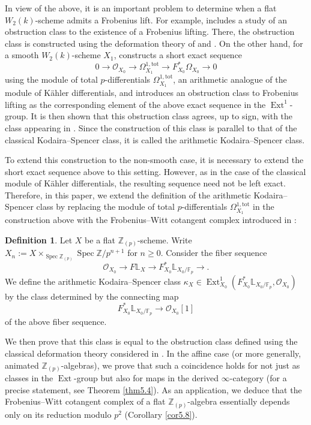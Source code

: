 \documentclass[11pt, a4paper]{amsart}
\theoremstyle{plain}
\theoremstyle{definition}
\newtheorem{definition}[theorem]{Definition}
\begin{document}
In view of the above, it is an important problem to determine when a flat $W_2(k)$-scheme admits a Frobenius lift. For example, \cite{Zda18} includes a study of an obstruction class to the existence of a Frobenius lifting. There, the obstruction class is constructed using the deformation theory of \cite{Ill71} and \cite{Ill72}. On the other hand, for a smooth $W_2(k)$-scheme $X_1$, \cite{DKRZB17} constructs a short exact sequence \[ 0\to \mathcal O_{X_0}\to \Omega_{X_1}^{1,\mathrm{tot}}\to F^*_{X_0}\Omega_{X_0}\to 0\] using the module of total $p$-differentials $\Omega_{X_1}^{1,\mathrm{tot}}$, an arithmetic analogue of the module of K\"ahler differentials, and introduces an obstruction class to Frobenius lifting as the corresponding element of the above exact sequence in the $\operatorname{Ext}^1$-group. It is then shown that this obstruction class agrees, up to sign, with the class appearing in \cite{DI87}. Since the construction of this class is parallel to that of the classical Kodaira--Spencer class, it is called the arithmetic Kodaira--Spencer class. 

To extend this construction to the non-smooth case, it is necessary to extend the short exact sequence above to this setting. However, as in the case of the classical module of K\"ahler differentials, the resulting sequence need not be left exact. Therefore, in this paper, we extend the definition of the arithmetic Kodaira--Spencer class by replacing the module of total $p$-differentials $\Omega_{X_1}^{1,\mathrm{tot}}$ in the construction above with the Frobenius--Witt cotangent complex introduced in \cite{Shi26}: 
\begin{definition}
    Let $X$ be a flat $\mathbb Z_{(p)}$-scheme. Write $X_n:=X\times_{\operatorname{Spec}\mathbb Z_{(p)}}\operatorname{Spec}\mathbb Z/p^{n+1}$ for $n\ge0$. Consider the fiber sequence
    \[\mathcal O_{X_0}\to F\mathbb L_{X}\to F^*_{X_0}\mathbb L_{X_0/\mathbb F_p}\to.\] We define the arithmetic Kodaira--Spencer class $\kappa_X\in \operatorname{Ext}^1_{X_0}(F_{X_0}^*\mathbb L_{X_0/\mathbb F_p},\mathcal O_{X_0})$ by the class determined by the connecting map\[F_{X_0}^*\mathbb L_{X_0/\mathbb F_p}\to \mathcal O_{X_0}[1]\] of the above fiber sequence.
\end{definition}
We then prove that this class is equal to the obstruction class defined using the classical deformation theory considered in \cite{Zda18}. In the affine case (or more generally, animated $\mathbb Z_{(p)}$-algebras), we prove that such a coincidence holds for not just as classes in the $\operatorname{Ext}$-group but also for maps in the derived $\infty$-category (for a precise statement, see Theorem \ref{thm5.4}). As an application, we deduce that the Frobenius--Witt cotangent complex of a flat $\mathbb{Z}_{(p)}$-algebra essentially depends only on its reduction modulo $p^2$ (Corollary \ref{cor5.8}).
\end{document}
